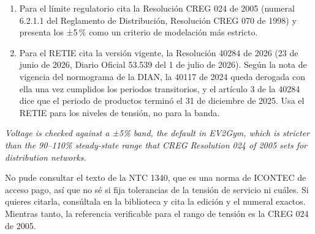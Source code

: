 \documentclass[11pt]{article}
\newenvironment{eng}{\begin{otherlanguage}{english}\itshape}{\end{otherlanguage}}
\begin{document}
\begin{tarea}
\begin{enumerate}
\item Para el límite regulatorio cita la Resolución CREG 024 de 2005 (numeral 6.2.1.1 del Reglamento de Distribución, Resolución CREG 070 de 1998) y presenta los ±5\,\% como un criterio de modelación más estricto.
\item Para el RETIE cita la versión vigente, la Resolución 40284 de 2026 (23 de junio de 2026, Diario Oficial 53.539 del 1 de julio de 2026). Según la nota de vigencia del normograma de la DIAN, la 40117 de 2024 queda derogada con ella una vez cumplidos los periodos transitorios, y el artículo 3 de la 40284 dice que el periodo de productos terminó el 31 de diciembre de 2025. Usa el RETIE para los niveles de tensión, no para la banda.
\end{enumerate}
\begin{eng}
Voltage is checked against a ±5\% band, the default in EV2Gym, which is stricter than the 90--110\% steady-state range that CREG Resolution 024 of 2005 sets for distribution networks.
\end{eng}
\end{tarea}

\begin{duda}[la NTC 1340]
No pude consultar el texto de la NTC 1340, que es una norma de ICONTEC de acceso pago, así que no sé si fija tolerancias de la tensión de servicio ni cuáles. Si quieres citarla, consúltala en la biblioteca y cita la edición y el numeral exactos. Mientras tanto, la referencia verificable para el rango de tensión es la CREG 024 de 2005.
\end{duda}
\end{document}
